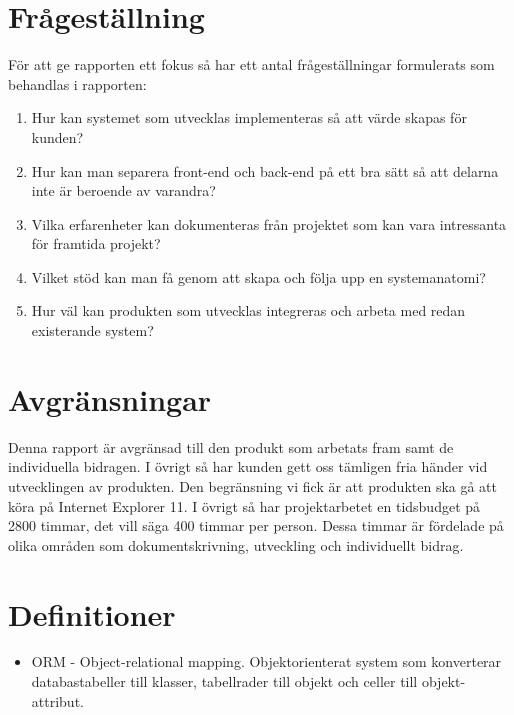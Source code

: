 \section{Frågeställning}
För att ge rapporten ett fokus så har ett antal frågeställningar formulerats som behandlas i rapporten:
\begin{enumerate}
	\item Hur kan systemet som utvecklas implementeras så att värde skapas för kunden?
	\item Hur kan man separera front-end och back-end på ett bra sätt så att delarna inte är beroende av varandra?
	\item Vilka erfarenheter kan dokumenteras från projektet som kan vara intressanta för framtida projekt?
	\item Vilket stöd kan man få genom att skapa och följa upp en systemanatomi?
	\item Hur väl kan produkten som utvecklas integreras och arbeta med redan existerande system?
\end{enumerate}

\section{Avgränsningar}
Denna rapport är avgränsad till den produkt som arbetats fram samt de individuella bidragen. I övrigt så har kunden gett oss tämligen fria händer vid utvecklingen av produkten. Den begränsning vi fick är att produkten ska gå att köra på Internet Explorer 11.
I övrigt så har projektarbetet en tidsbudget på 2800 timmar, det vill säga 400 timmar per person. Dessa timmar är fördelade på olika områden som dokumentskrivning, utveckling och individuellt bidrag.

\section{Definitioner}

\begin{itemize}

\item ORM - Object-relational mapping. Objektorienterat system som konverterar databastabeller till klasser, tabellrader till objekt och celler till objekt-attribut.

\end{itemize}

\newpage
